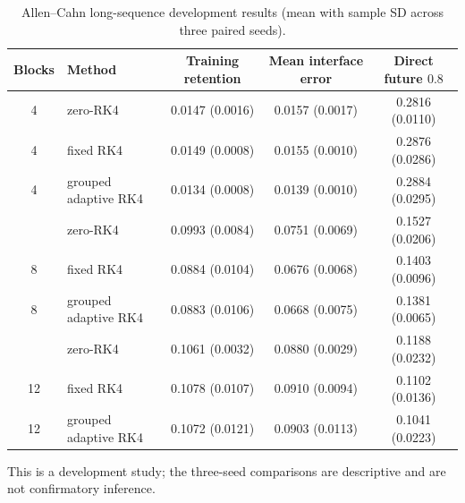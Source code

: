 \begin{table}[t]
\centering
\caption{Allen--Cahn long-sequence development results (mean with sample SD across three paired seeds).}
\label{tab:allen_cahn_long_sequence}
\small
\begin{tabular}{clccc}
\toprule
Blocks & Method & Training retention & Mean interface error & Direct future $0.8$ \\
\midrule
4 & zero-RK4 & 0.0147 (0.0016) & 0.0157 (0.0017) & 0.2816 (0.0110) \\
4 & fixed RK4 & 0.0149 (0.0008) & 0.0155 (0.0010) & 0.2876 (0.0286) \\
4 & grouped adaptive RK4 & 0.0134 (0.0008) & 0.0139 (0.0010) & 0.2884 (0.0295) \\
\addlinespace
8 & zero-RK4 & 0.0993 (0.0084) & 0.0751 (0.0069) & 0.1527 (0.0206) \\
8 & fixed RK4 & 0.0884 (0.0104) & 0.0676 (0.0068) & 0.1403 (0.0096) \\
8 & grouped adaptive RK4 & 0.0883 (0.0106) & 0.0668 (0.0075) & 0.1381 (0.0065) \\
\addlinespace
12 & zero-RK4 & 0.1061 (0.0032) & 0.0880 (0.0029) & 0.1188 (0.0232) \\
12 & fixed RK4 & 0.1078 (0.0107) & 0.0910 (0.0094) & 0.1102 (0.0136) \\
12 & grouped adaptive RK4 & 0.1072 (0.0121) & 0.0903 (0.0113) & 0.1041 (0.0223) \\
\bottomrule
\end{tabular}
\vspace{2pt}
\begin{minipage}{0.96\linewidth}\footnotesize
This is a development study; the three-seed comparisons are descriptive and are not confirmatory inference.
\end{minipage}
\end{table}
